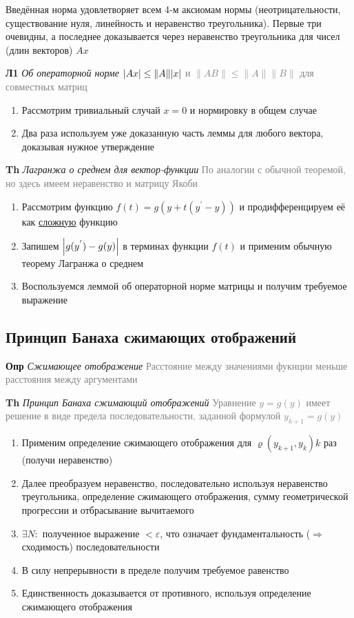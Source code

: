 Введённая норма удовлетворяет всем 4-м аксиомам нормы (неотрицательности, существование нуля, линейность и
неравенство треугольника).
Первые три очевидны, а последнее доказывается через неравенство треугольника для чисел (длин векторов) $Ax$

\textbf{Л1} \textit{Об операторной норме}
\textcolor{gray}{$\abs{Ax} \leq \|A\| \abs{x}$ и $\|AB\| \leq \|A\| \|B\|$ для совместных матриц}

\begin{enumerate}
    \item Рассмотрим тривиальный случай $x = 0$ и нормировку в общем случае
    \item Два раза используем уже доказанную часть леммы для любого вектора, доказывая нужное утверждение
\end{enumerate}

\textbf{Th} \textit{Лагранжа о среднем для вектор-функции}
\textcolor{gray}{По аналогии с обычной теоремой, но здесь имеем неравенство и матрицу Якоби}

\begin{enumerate}
    \item Рассмотрим функцию $f(t) = g(y + t(y^{'} - y))$ и продифференцируем её как \underline{сложную} функцию
    \item Запишем $\abs{g(y^{'}) - g(y)}$ в терминах функции $f(t)$ и применим обычную теорему Лагранжа о среднем
    \item Воспользуемся леммой об операторной норме матрицы и получим требуемое выражение
\end{enumerate}

\subsection{Принцип Банаха сжимающих отображений}

\textbf{Опр} \textit{Сжимающее отображение}
\textcolor{gray}{Расстояние между значениями фукнции меньше расстояния между аргументами}

\textbf{Th} \textit{Принцип Банаха сжимающий отображений}
\textcolor{gray}{Уравнение $y = g(y)$ имеет решение в виде предела последовательности, заданной формулой $y_{k+1} = g
(y)$}

\begin{enumerate}
    \item Применим определение сжимающего отображения для $\varrho(y_{k+1},y_k) k$ раз (получи неравенство)
    \item Далее преобразуем неравенство, последовательно используя неравенство треугольника, определение сжимающего
    отображения, сумму геометрической прогрессии и отбрасывание вычитаемого
    \item $\exists N:$ полученное выражение $< \varepsilon $, что означает фундаментальность ($\Rightarrow$ сходимость) последовательности
    \item В силу непрерывности в пределе получим требуемое равенство
    \item Единственность доказывается от противного, используя определение сжимающего отображения
\end{enumerate}

